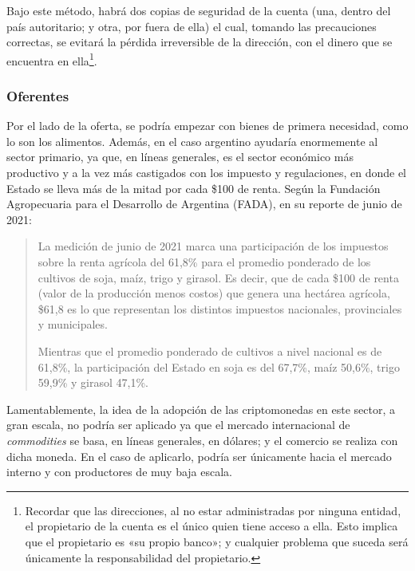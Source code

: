 \documentclass[12pt,a4paper,twoside]{book}
\begin{document}
Bajo este método, habrá dos copias de seguridad de la cuenta (una, dentro del país autoritario; y otra, por fuera de ella) el cual, tomando las precauciones correctas, se evitará la pérdida irreversible de la dirección, con el dinero que se encuentra en ella\footnote{Recordar que las direcciones, al no estar administradas por ninguna entidad, el propietario de la cuenta es el único quien tiene acceso a ella. Esto implica que el propietario es «su propio banco»; y cualquier problema que suceda será únicamente la responsabilidad del propietario.}.

\subsubsection{Oferentes}
Por el lado de la oferta, se podría empezar con bienes de primera necesidad, como lo son los alimentos. Además, en el caso argentino ayudaría enormemente al sector primario, ya que, en líneas generales, es el sector económico más productivo y a la vez más castigados con los impuesto y regulaciones, en donde el Estado se lleva más de la mitad por cada \$100 de renta. Según la Fundación Agropecuaria para el Desarrollo de Argentina (FADA), en su reporte de junio de 2021:

\begin{quotation}
La medición de junio de 2021 marca una participación de los impuestos sobre la renta agrícola del 61,8\% para el promedio ponderado de los cultivos de soja, maíz, trigo y girasol. Es decir, que de cada \$100 de renta (valor de la producción menos costos) que genera una hectárea agrícola, \$61,8 es lo que representan los distintos impuestos nacionales, provinciales y municipales. 

Mientras que el promedio ponderado de cultivos a nivel nacional es de 61,8\%, la participación del Estado en soja es del 67,7\%, maíz 50,6\%, trigo 59,9\% y girasol 47,1\%. \cite[pág. 1]{fada:impuestos}
\end{quotation}

Lamentablemente, la idea de la adopción de las criptomonedas en este sector, a gran escala, no podría ser aplicado ya que el mercado internacional de \textit{commodities} se basa, en líneas generales, en dólares; y el comercio se realiza con dicha moneda. En el caso de aplicarlo, podría ser únicamente hacia el mercado interno y con productores de muy baja escala.
\end{document}
